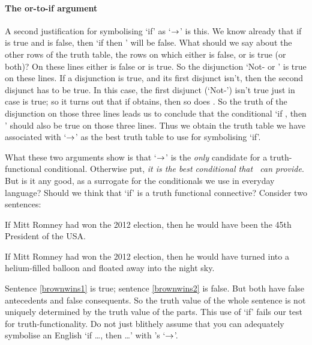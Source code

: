 \paragraph{The or-to-if argument} A second justification for symbolising `if' as `$\rightarrow$' is this. We know already that if  is true and  is false, then `if  then ' will be false. What should we say about the other rows of the truth table, the rows on which either  is false, or  is true (or both)? On these lines either  is false or  is true. So the disjunction `Not- or ' is true on these lines. If a disjunction is true, and its first disjunct isn't, then the second disjunct has to be true. In this case, the first disjunct (`Not-') isn't true just in case  is true; so it turns out that if  obtains, then so does . So the truth of the disjunction on those three lines leads us to conclude that the conditional `if , then ' should also be true on those three lines. Thus we obtain the truth table we have associated with `$\rightarrow$' as the best truth table to use for symbolising `if'.


What these two arguments show is that `$\rightarrow$' is the \emph{only} candidate for a truth-functional conditional. Otherwise put, \emph{it is the best conditional that \TFL\ can provide}. But is it any good, as a surrogate for the conditionals we use in everyday language? Should we think that `if' is a truth functional connective? Consider two sentences:
	\begin{earg}
		\item[\ex{brownwins1}] If Mitt Romney had won the 2012 election, then he would have been the 45th President of the USA.
		\item[\ex{brownwins2}] If Mitt Romney had won the 2012 election, then he would have turned into a helium-filled balloon and floated away into the night sky.
	\end{earg}
Sentence \ref{brownwins1} is true; sentence \ref{brownwins2} is false. But both have false antecedents and false consequents. So the truth value of the whole sentence is not uniquely determined by the truth value of the parts. This use of `if' fails our test for truth-functionality. Do not just blithely assume that you can adequately symbolise an English `if …, then …' with \TFL's `$\rightarrow$'. 

